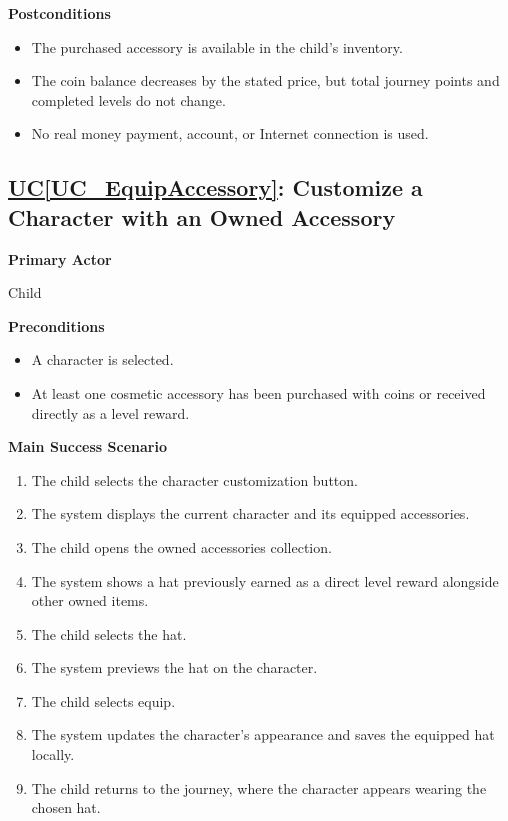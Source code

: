 \documentclass[12pt]{article}
\newcounter{ucnum} %
\newcommand{\ucref}[1]{\hyperref[#1]{UC\ref*{#1}}}
\begin{document}
\textbf{Postconditions}
\begin{itemize}
    \item The purchased accessory is available in the child's inventory.
    \item The coin balance decreases by the stated price, but total
    journey points and completed levels do not change.
    \item No real money payment, account, or Internet connection is used.
\end{itemize}

\label{UC_EquipAccessory}
\subsection{\ucref{UC_EquipAccessory}: Customize a Character with an Owned Accessory}

\textbf{Primary Actor}

Child

\textbf{Preconditions}
\begin{itemize}
    \item A character is selected.
    \item At least one cosmetic accessory has been purchased
    with coins or received directly as a level reward.
\end{itemize}

\textbf{Main Success Scenario}
\begin{enumerate}
    \item The child selects the character customization button.
    \item The system displays the current character and its
    equipped accessories.
    \item The child opens the owned accessories collection.
    \item The system shows a hat previously earned as a direct
    level reward alongside other owned items.
    \item The child selects the hat.
    \item The system previews the hat on the character.
    \item The child selects equip.
    \item The system updates the character's appearance and saves
    the equipped hat locally.
    \item The child returns to the journey, where the character
    appears wearing the chosen hat.
\end{enumerate}
\end{document}
